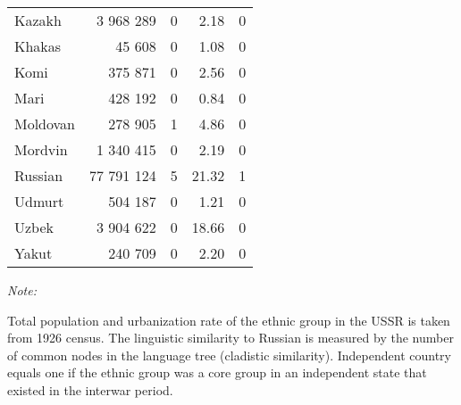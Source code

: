 \begin{table}[!h]
\begin{threeparttable}
\begin{tabular}{lrrrr}
Kazakh & 3 968 289 & 0 & 2.18 & 0\\
Khakas & 45 608 & 0 & 1.08 & 0\\
Komi & 375 871 & 0 & 2.56 & 0\\
Mari & 428 192 & 0 & 0.84 & 0\\
Moldovan & 278 905 & 1 & 4.86 & 0\\
Mordvin & 1 340 415 & 0 & 2.19 & 0\\
Russian & 77 791 124 & 5 & 21.32 & 1\\
Udmurt & 504 187 & 0 & 1.21 & 0\\
Uzbek & 3 904 622 & 0 & 18.66 & 0\\
Yakut & 240 709 & 0 & 2.20 & 0\\
\bottomrule
\end{tabular}
\begin{tablenotes}
\item \textit{Note: } 
\item Total population and urbanization rate of the ethnic group in the USSR is taken from 1926 census. The linguistic similarity to Russian is measured by the number of common nodes in the language tree (cladistic similarity). Independent country equals one if the ethnic group was a core group in an independent state that existed in the interwar period.
\end{tablenotes}
\end{threeparttable}
\end{table}